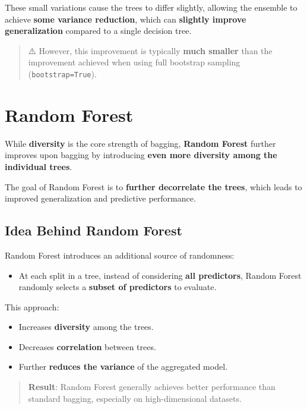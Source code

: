 \documentclass[
  letterpaper,
  DIV=11,
  numbers=noendperiod]{scrreprt}
\providecommand{\tightlist}{%
  \setlength{\itemsep}{0pt}\setlength{\parskip}{0pt}}\usepackage{longtable,booktabs,array}
\begin{document}
These small variations cause the trees to differ slightly, allowing the
ensemble to achieve \textbf{some variance reduction}, which can
\textbf{slightly improve generalization} compared to a single decision
tree.

\begin{quote}
⚠️ However, this improvement is typically \textbf{much smaller} than the
improvement achieved when using full bootstrap sampling
(\texttt{bootstrap=True}).
\end{quote}

\section{Random Forest}\label{random-forest}

While \textbf{diversity} is the core strength of bagging, \textbf{Random
Forest} further improves upon bagging by introducing \textbf{even more
diversity among the individual trees}.

The goal of Random Forest is to \textbf{further decorrelate the trees},
which leads to improved generalization and predictive performance.

\subsection{Idea Behind Random Forest}\label{idea-behind-random-forest}

Random Forest introduces an additional source of randomness:

\begin{itemize}
\tightlist
\item
  At each split in a tree, instead of considering \textbf{all
  predictors}, Random Forest randomly selects a \textbf{subset of
  predictors} to evaluate.
\end{itemize}

This approach:

\begin{itemize}
\tightlist
\item
  Increases \textbf{diversity} among the trees.
\item
  Decreases \textbf{correlation} between trees.
\item
  Further \textbf{reduces the variance} of the aggregated model.
\end{itemize}

\begin{quote}
\textbf{Result}: Random Forest generally achieves better performance
than standard bagging, especially on high-dimensional datasets.
\end{quote}
\end{document}
